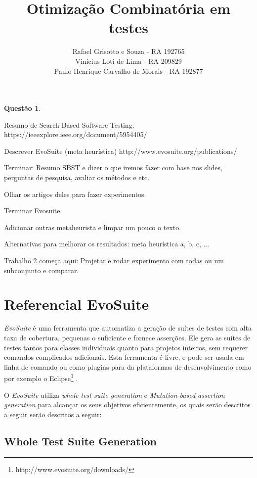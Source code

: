 \documentclass[12pt,a4paper]{article}
\title{Otimização Combinatória em  \\ testes}
\author{Rafael Grisotto e Souza - RA 192765\\ Vinícius Loti de Lima - RA 209829 \\ Paulo Henrique Carvalho de Morais - RA 192877}
\newtheorem{questao}{Questão}
\begin{document}
\maketitle


\begin{questao}
\end{questao}

Resumo de Search-Based Software Testing.
https://ieeexplore.ieee.org/document/5954405/

Descrever EvoSuite (meta heurística)
http://www.evosuite.org/publications/

Terminar: Resumo SBST e dizer o que iremos fazer com base nos slides, perguntas de pesquisa, avaliar os métodos e etc. 


Olhar os artigos deles para fazer experimentos.

Terminar Evosuite

Adicionar outras metaheurista e limpar um pouco o texto.

Alternativas para melhorar os resultados: meta heurística a, b, c, ...


Trabalho 2 começa aqui:
\cite{arcuri2017restful}
Projetar e rodar experimento com todas ou um subconjunto e comparar.

\listoftodos[Notes]



\newpage

\section{Referencial EvoSuite}

\textit{EvoSuite} é uma ferramenta que automatiza a geração de suítes de testes com alta taxa de cobertura, pequenas o suficiente e fornece asserções. Ele gera as suítes de testes tantos para classes individuais quanto para projetos inteiros, sem requerer comandos complicados adicionais. Esta ferramenta é livre, e pode ser usada em linha de comando ou como  plugins para da plataformas de desenvolvimento como por exemplo o Eclipse\footnote{http://www.evosuite.org/downloads/} \cite{fraser2011evosuite}.

O \textit{EvoSuite} utiliza \textit{whole test suite generation} e \textit{Mutation-based assertion generation} para alcançar os seus objetivos eficientemente, os quais serão descritos a seguir serão descritos a seguir:

\subsection{Whole Test Suite Generation}
\end{document}
